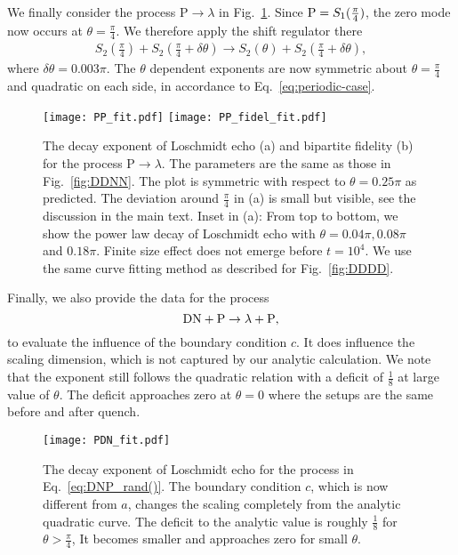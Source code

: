 We finally consider the process {\color{red}$\text{P} \rightarrow \lambda$}
in Fig.~\ref{fig:PPPP}. Since ${\rm P} = S_1( \frac{\pi}{4} ) $, the zero mode now occurs at $\theta = \frac{\pi}{4}$. We therefore apply the shift regulator there 
\begin{equation}
\begin{aligned}
\label{eq:approx_PPPP}
S_2\left(\frac{\pi}{4}\right)+S_2\left(\frac{\pi}{4}+\delta\theta\right)\rightarrow S_2(\theta)+S_2\left(\frac{\pi}{4}+\delta\theta\right),
\end{aligned}
\end{equation}
where $\delta\theta=0.003\pi$. The $\theta$ dependent exponents are now symmetric about $\theta=\frac{\pi}{4}$ and quadratic on each side, in accordance to Eq.~\eqref{eq:periodic-case}.

\begin{figure}
  \centering
  \texttt{[image: PP\_fit.pdf]}
    \texttt{[image: PP\_fidel\_fit.pdf]}
    \caption{The decay exponent of Loschmidt echo (a) and bipartite fidelity (b) for the process $\text{P} \rightarrow \lambda${\iffalse in Eq.~\eqref{eq:PP}\fi}. The parameters are the same as those in Fig.~\ref{fig:DDNN}. The plot is symmetric with respect to $\theta=0.25\pi$ as predicted. The deviation around $\frac{\pi}{4}$ in (a) is small but visible, see the discussion in the main text. Inset in (a): From top to bottom, we show the power law decay of Loschmidt echo with $\theta=0.04\pi, 0.08\pi $ and $0.18\pi$. Finite size effect does not emerge before $t=10^{4}$. We use the same curve fitting method as described for Fig.~\ref{fig:DDDD}.}
    \label{fig:PPPP}
\end{figure}

Finally, we also provide the data for the process
\begin{equation}
\label{eq:DNP_rand()}
{\rm DN} + {\rm P} \rightarrow \lambda  + {\rm P},
\end{equation}
to evaluate the influence of the boundary condition $c$. It {\rm does} influence the scaling dimension, which is not captured by our analytic calculation. {\color{red}We note that the exponent still follows the quadratic relation with a deficit of $\frac{1}{8}$ at large value of $\theta$. The deficit approaches zero at $\theta=0$ where the setups are the same before and after quench.}
\begin{figure}[htb]
\centering
\texttt{[image: PDN\_fit.pdf]}
\caption{The decay exponent of Loschmidt echo for the process {\color{red}in Eq.~\eqref{eq:DNP_rand()}.} The boundary condition $c$, which is now different from $a$, changes the scaling completely from the analytic quadratic curve. The deficit to the analytic value is roughly $\frac{1}{8}$ for $\theta > \frac{\pi}{4}$, It becomes smaller and approaches zero for small $\theta$. }
\label{fig:PDN_fit}
\end{figure}

